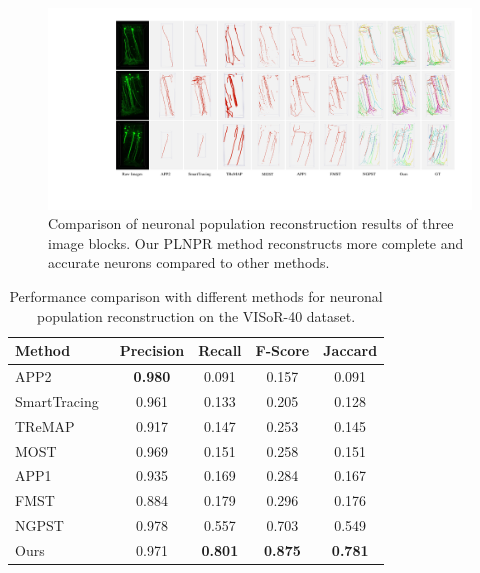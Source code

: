 \begin{figure}[t]
	\centering
	\includegraphics[width=1\textwidth]{./Illustrations/iteration3.pdf}
	\caption{Comparison of neuronal population reconstruction results of three image blocks. %
Our PLNPR method reconstructs more complete and accurate neurons compared to other methods. 
	}
	\label{fig:compare_VISoR}
\end{figure}



\begin{table}[th]
	\centering
	\caption{Performance comparison with different methods for neuronal population reconstruction on the VISoR-40 dataset.}
	\label{table:compare_VISoR}
	\begin{tabular}{lcccc}
		\toprule
		Method & Precision & Recall & F-Score & Jaccard\\
		\midrule
		APP2~\cite{Xiao2013}
		& \textbf{0.980} & 0.091 & 0.157 & 0.091\\
		SmartTracing~\cite{Chen2015}
		& 0.961 & 0.133 & 0.205 & 0.128\\
		TReMAP~\cite{Zhou2016}
		& 0.917 & 0.147 & 0.253 & 0.145\\
		MOST~\cite{Wu2014}          
		& 0.969 & 0.151& 0.258& 0.151\\
		APP1~\cite{Peng2011}
		& 0.935 & 0.169 & 0.284 & 0.167\\
		FMST~\cite{Yang2018}
		& 0.884 & 0.179 & 0.296 &  0.176\\
		NGPST~\cite{Quan2015}
		& 0.978 & 0.557& 0.703 & 0.549\\
		\midrule
		Ours
		& 0.971 & \textbf{0.801}&\textbf{0.875} & \textbf{0.781}\\
		\bottomrule
	\end{tabular}
\end{table}

